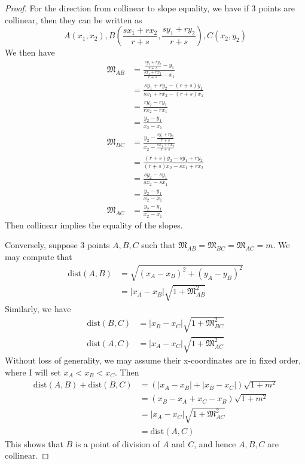 \documentclass[12pt]{article}
\begin{document}
    \begin{proof}
        For the direction from collinear to slope equality, we have if 3 points are collinear, then they can be written as $$A(x_1,x_2), B(\frac{sx_1+rx_2}{r+s}, \frac{sy_1+ry_2}{r+s}), C(x_2,y_2)$$
        We then have \begin{align*}
            \mathfrak{M}_{AB}&=\frac{\frac{sy_1+ry_2}{r+s}-y_1}{\frac{sx_1+rx_2}{r+s}-x_1}\\
            &=\frac{sy_1+ry_2-(r+s)y_1}{sx_1+rx_2-(r+s)x_1}\\
            &=\frac{ry_2-ry_1}{rx_2-rx_1}\\
            &=\frac{y_2-y_1}{x_2-x_1}\\
            \mathfrak{M}_{BC}&=\frac{y_2-\frac{sy_1+ry_2}{r+s}}{x_2-\frac{sx_1+rx_2}{r+s}}\\
            &=\frac{(r+s)y_2-sy_1+ry_2}{(r+s)x_2-sx_1+rx_2}\\
            &=\frac{sy_2-sy_1}{sx_2-sx_1}\\
            &=\frac{y_2-y_1}{x_2-x_1}\\
            \mathfrak{M}_{AC}&=\frac{y_2-y_1}{x_2-x_1}
        \end{align*}
        Then collinear implies the equality of the slopes.

        Conversely, suppose 3 points $A,B,C$ such that $\mathfrak{M}_{AB}=\mathfrak{M}_{BC}=\mathfrak{M}_{AC}=m$. We may compute that \begin{align*}
            \mathrm{dist}(A,B)&=\sqrt{(x_A-x_B)^2+(y_A-y_B)^2}\\
            &=|x_A-x_B|\sqrt{1+\mathfrak{M}_{AB}^2}
        \end{align*}
        Similarly, we have \begin{align*}
            \mathrm{dist}(B,C)&=|x_B-x_C|\sqrt{1+\mathfrak{M}_{BC}^2}\\
            \mathrm{dist}(A,C)&=|x_A-x_C|\sqrt{1+\mathfrak{M}_{AC}^2}
        \end{align*}
        Without loss of generality, we may assume their x-coordinates are in fixed order, where I will set $x_A<x_B<x_C$. Then \begin{align*}
            \mathrm{dist}(A,B)+\mathrm{dist}(B,C)&=(|x_A-x_B|+|x_B-x_C|)\sqrt{1+m^2}\\
            &=(x_B-x_A+x_C-x_B)\sqrt{1+m^2}\\
            &=|x_A-x_C|\sqrt{1+\mathfrak{M}_{AC}^2}\\
            &=\mathrm{dist}(A,C)
        \end{align*}
        This shows that $B$ is a point of division of $A$ and $C$, and hence $A,B,C$ are collinear.
    \end{proof}
\end{document}
